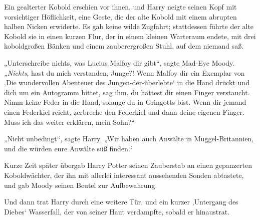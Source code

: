Ein gealterter Kobold erschien vor ihnen, und Harry neigte seinen Kopf mit vorsichtiger Höflichkeit, eine Geste, die der alte Kobold mit einem abrupten halben Nicken erwiderte. Es gab keine wilde Zugfahrt; stattdessen führte der alte Kobold sie in einen kurzen Flur, der in einem kleinen Warteraum endete, mit drei koboldgroßen Bänken und einem zauberergroßen Stuhl, auf dem niemand saß.

„Unterschreibe nichts, was Lucius Malfoy dir gibt“, sagte Mad-Eye Moody. \emph{„Nichts}, hast du mich verstanden, Junge?! Wenn Malfoy dir ein Exemplar von ‚Die wundervollen Abenteuer des Jungen-der-überlebte‘ in die Hand drückt und dich um ein Autogramm bittet, sag ihm, du hättest dir einen Finger verstaucht. Nimm keine Feder in die Hand, solange du in Gringotts bist. Wenn dir jemand einen Federkiel reicht, zerbreche den Federkiel und dann deine eigenen Finger. Muss ich das weiter erklären, mein Sohn?“

„Nicht unbedingt“, sagte Harry. „Wir haben auch Anwälte in Muggel-Britannien, und die würden eure Anwälte süß finden.“

Kurze Zeit später übergab Harry Potter seinen Zauberstab an einen gepanzerten Koboldwächter, der ihn mit allerlei interessant aussehenden Sonden abtastete, und gab Moody seinen Beutel zur Aufbewahrung.

Und dann trat Harry durch eine weitere Tür, und ein kurzer ‚Untergang des Diebes‘ Wasserfall, der von seiner Haut verdampfte, sobald er hinaustrat.


